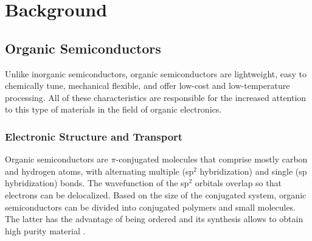 \chapter{Background} \label{chap:background}

\section{Organic Semiconductors}

Unlike inorganic semiconductors, organic semiconductors are lightweight, easy to chemically tune, mechanical flexible, and offer low-cost and low-temperature processing. All of these characteristics are responsible for the increased attention to this type of materials in the field of organic electronics. 


\subsection{Electronic Structure and Transport} 

Organic semiconductors are $\pi$-conjugated molecules that comprise mostly carbon and hydrogen atoms, with alternating multiple (sp$^{2}$ hybridization) and single (sp hybridization) bonds. The wavefunction of the sp$^{2}$ orbitals overlap so that electrons can be delocalized.
Based on the size of the conjugated system, organic semiconductors can be divided into conjugated polymers and small molecules. The latter has the advantage of being ordered and its synthesis allows to obtain high purity material \cite{alcacerElectronicStructureOrganic2018}.

